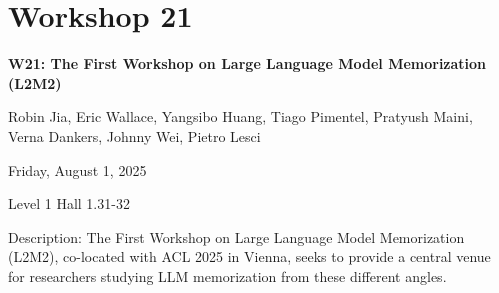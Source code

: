 \clearpage


\section[W21: The First Workshop on Large Language Model Memorization (L2M2)]{Workshop 21}
\label{workshop_21}

\begin{center}
    {\Large \textbf{W21: The First Workshop on Large Language Model Memorization (L2M2)}}\\
    
 \vspace{5mm}

Robin Jia, Eric Wallace, Yangsibo Huang, Tiago Pimentel, Pratyush Maini, Verna Dankers, Johnny Wei, Pietro Lesci\\

 \vspace{5mm}

    Friday, August 1, 2025

    Level 1 Hall 1.31-32
    
\end{center}

Description: The First Workshop on Large Language Model Memorization (L2M2), co-located with ACL 2025 in Vienna, seeks to provide a central venue for researchers studying LLM memorization from these different angles.


